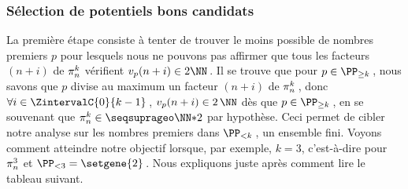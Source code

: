 \subsubsection{Sélection de potentiels bons candidats} \label{algos-used-select}

\leavevmode
\smallskip

La première étape consiste à tenter de trouver le moins possible de nombres premiers $p$ pour lesquels nous ne pouvons pas affirmer que tous les facteurs $(n+i)$ de $\consprod$ vérifient $\padicval{n+i} \in 2 \NN$\,.
Il se trouve que pour $p \in \PP_{\geq k}$\,, nous savons que $p$ divise au maximum un facteur $(n+i)$ de $\consprod$\,, donc $\forall i \in \ZintervalC{0}{k-1}$\,, $\padicval{n+i} \in 2\,\NN$ dès que $p \in \PP_{\geq k}$\,, en se souvenant que $\consprod \in \NNssquare$ par hypothèse.
Ceci permet de cibler notre analyse sur les nombres premiers dans $\PP_{< k}$\,, un ensemble fini. 
Voyons comment atteindre notre objectif lorsque, par exemple, $k = 3$, c'est-à-dire pour $\consprod<3>$ et $\PP_{< 3} = \setgene{2}$\,. Nous expliquons juste après comment lire le tableau suivant.


\begin{center}
\end{center}

